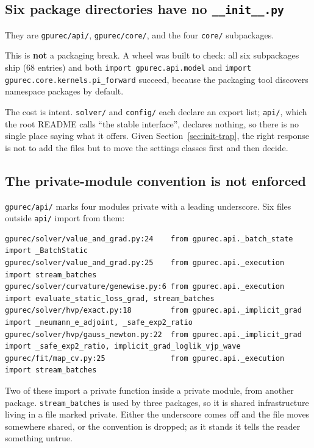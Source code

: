 \documentclass[11pt]{article}
\newcommand{\dir}[1]{\nolinkurl{#1}}
\begin{document}
\subsection{Six package directories have no \texttt{\_\_init\_\_.py}}
\label{sec:init}

They are \dir{gpurec/api/}, \dir{gpurec/core/}, and the four \dir{core/}
subpackages.

This is \textbf{not} a packaging break.  A wheel was built to check: all six
subpackages ship (68 entries) and both
\texttt{import gpurec.api.model} and
\texttt{import gpurec.core.kernels.pi\_forward} succeed, because the packaging
tool discovers namespace packages by default.

The cost is intent.  \dir{solver/} and \dir{config/} each declare an export
list; \dir{api/}, which the root README calls ``the stable interface'', declares
nothing, so there is no single place saying what it offers.  Given
Section~\ref{sec:init-trap}, the right response is not to add the files but to
move the settings classes first and then decide.

\subsection{The private-module convention is not enforced}

\dir{gpurec/api/} marks four modules private with a leading underscore.  Six
files outside \dir{api/} import from them:

\begin{lstlisting}
gpurec/solver/value_and_grad.py:24    from gpurec.api._batch_state   import _BatchStatic
gpurec/solver/value_and_grad.py:25    from gpurec.api._execution     import stream_batches
gpurec/solver/curvature/genewise.py:6 from gpurec.api._execution     import evaluate_static_loss_grad, stream_batches
gpurec/solver/hvp/exact.py:18         from gpurec.api._implicit_grad import _neumann_e_adjoint, _safe_exp2_ratio
gpurec/solver/hvp/gauss_newton.py:22  from gpurec.api._implicit_grad import _safe_exp2_ratio, implicit_grad_loglik_vjp_wave
gpurec/fit/map_cv.py:25               from gpurec.api._execution     import stream_batches
\end{lstlisting}

Two of these import a private function inside a private module, from another
package.  \texttt{stream\_batches} is used by three packages, so it is shared
infrastructure living in a file marked private.  Either the underscore comes off
and the file moves somewhere shared, or the convention is dropped; as it stands
it tells the reader something untrue.
\end{document}
